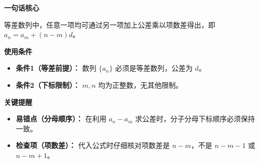 \begin{summarybox}
	\textbf{\textcolor{CSummary}{一句话核心}}

	等差数列中，任意一项均可通过另一项加上公差乘以项数差得出，即 \(a_n = a_m + (n-m)d\)。

	\medskip
	\textbf{\textcolor{CSummary}{使用条件}}
	\begin{itemize}[leftmargin=*, itemsep=0.5em, topsep=0.4em]
		\item \textbf{条件1（等差前提）：} 数列 \(\{a_n\}\) 必须是等差数列，公差为 \(d\)。
		\item \textbf{条件2（下标限制）：} \(m,n\) 均为正整数，无其他限制。
	\end{itemize}

	\medskip
	\textbf{\textcolor{CSummary}{关键提醒}}
	\begin{itemize}[leftmargin=*, itemsep=0.5em, topsep=0.4em]
		\item \textbf{易错点（分母顺序）：} 在利用 \(a_n - a_m\) 求公差时，分子分母下标顺序必须保持一致。
		\item \textbf{检查项（项数差）：} 代入公式时仔细核对项数差是 \(n-m\)，不是 \(n-m-1\) 或 \(n-m+1\)。
	\end{itemize}
\end{summarybox}